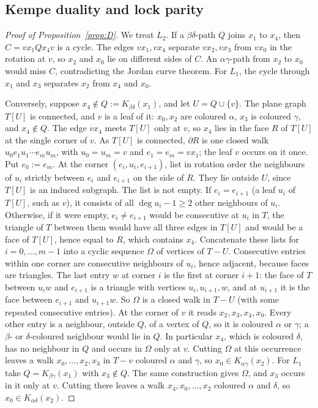 \documentclass[11pt]{article}
\theoremstyle{definition}
\begin{document}
\subsection{Kempe duality and lock parity}
\begin{proof}[Proof of Proposition~\ref{prop:D}]
We treat $L_2$. If a $\beta\delta$-path $Q$ joins $x_1$ to $x_4$, then $C=vx_1Qx_4v$ is a cycle. The edges $vx_1,vx_4$ separate $vx_2,vx_3$ from $vx_0$ in the rotation at $v$, so $x_2$ and $x_0$ lie on different sides of $C$. An $\alpha\gamma$-path from $x_2$ to $x_0$ would miss $C$, contradicting the Jordan curve theorem. For $L_1$, the cycle through $x_1$ and $x_3$ separates $x_2$ from $x_4$ and $x_0$.

Conversely, suppose $x_4\notin Q:=K_{\beta\delta}(x_1)$, and let $U=Q\cup\{v\}$. The plane graph $T[U]$ is connected, and $v$ is a leaf of it: $x_0,x_2$ are coloured $\alpha$, $x_3$ is coloured $\gamma$, and $x_4\notin Q$. The edge $vx_4$ meets $T[U]$ only at $v$, so $x_4$ lies in the face $R$ of $T[U]$ at the single corner of $v$. As $T[U]$ is connected, $\partial R$ is one closed walk $u_0e_1u_1\cdots e_mu_m$, with $u_0=u_m=v$ and $e_1=e_m=vx_1$; the leaf $v$ occurs on it once. Put $e_0:=e_m$. At the corner $(e_i,u_i,e_{i+1})$, list in rotation order the neighbours of $u_i$ strictly between $e_i$ and $e_{i+1}$ on the side of $R$. They lie outside $U$, since $T[U]$ is an induced subgraph. The list is not empty. If $e_i=e_{i+1}$ (a leaf $u_i$ of $T[U]$, such as $v$), it consists of all $\deg u_i-1\ge2$ other neighbours of $u_i$. Otherwise, if it were empty, $e_i\ne e_{i+1}$ would be consecutive at $u_i$ in $T$, the triangle of $T$ between them would have all three edges in $T[U]$ and would be a face of $T[U]$, hence equal to $R$, which contains $x_4$. Concatenate these lists for $i=0,\dots,m-1$ into a cyclic sequence $\Omega$ of vertices of $T-U$. Consecutive entries within one corner are consecutive neighbours of $u_i$, hence adjacent, because faces are triangles. The last entry $w$ at corner $i$ is the first at corner $i+1$: the face of $T$ between $u_iw$ and $e_{i+1}$ is a triangle with vertices $u_i,u_{i+1},w$, and at $u_{i+1}$ it is the face between $e_{i+1}$ and $u_{i+1}w$. So $\Omega$ is a closed walk in $T-U$ (with some repeated consecutive entries). At the corner of $v$ it reads $x_2,x_3,x_4,x_0$. Every other entry is a neighbour, outside $Q$, of a vertex of $Q$, so it is coloured $\alpha$ or $\gamma$; a $\beta$- or $\delta$-coloured neighbour would lie in $Q$. In particular $x_4$, which is coloured $\delta$, has no neighbour in $Q$ and occurs in $\Omega$ only at $v$. Cutting $\Omega$ at this occurrence leaves a walk $x_0,\dots,x_2,x_3$ in $T-v$ coloured $\alpha$ and $\gamma$, so $x_0\in K_{\alpha\gamma}(x_2)$. For $L_1$ take $Q=K_{\beta\gamma}(x_1)$ with $x_3\notin Q$. The same construction gives $\Omega$, and $x_3$ occurs in it only at $v$. Cutting there leaves a walk $x_4,x_0,\dots,x_2$ coloured $\alpha$ and $\delta$, so $x_0\in K_{\alpha\delta}(x_2)$.
\end{proof}
\end{document}
